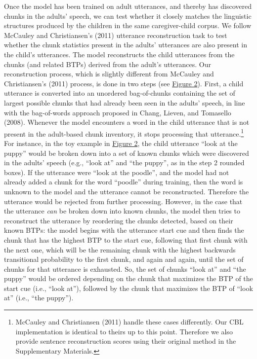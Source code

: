 \documentclass[
  english,
  man,floatsintext]{apa6}
\begin{document}
Once the model has been trained on adult utterances, and thereby has discovered chunks in the adults' speech, we can test whether it closely matches the linguistic structures produced by the children in the same caregiver-child corpus. We follow McCauley and Christiansen's (2011) utterance reconstruction task to test whether the chunk statistics present in the adults' utterances are also present in the child's utterances. The model reconstructs the child utterances from the chunks (and related BTPs) derived from the adult's utterances. Our reconstruction process, which is slightly different from McCauley and Christiansen's (2011) process, is done in two steps (see \protect\hyperlink{fig2}{Figure 2}). First, a child utterance is converted into an unordered bag-of-chunks containing the set of largest possible chunks that had already been seen in the adults' speech, in line with the bag-of-words approach proposed in Chang, Lieven, and Tomasello (2008). Whenever the model encounters a word in the child utterance that is not present in the adult-based chunk inventory, it stops processing that utterance.\footnote{McCauley and Christiansen (2011) handle these cases differently. Our CBL implementation is identical to theirs up to this point. Therefore we also provide sentence reconstruction scores using their original method in the Supplementary Materials.} For instance, in the toy example in \protect\hyperlink{fig2}{Figure 2}, the child utterance \enquote{look at the puppy} would be broken down into a set of known chunks which were discovered in the adults' speech (e.g., \enquote{look at} and \enquote{the puppy}, as in the step 2 rounded boxes). If the utterance were \enquote{look at the poodle}, and the model had not already added a chunk for the word \enquote{poodle} during training, then the word is unknown to the model and the utterance cannot be reconstructed. Therefore the utterance would be rejected from further processing. However, in the case that the utterance \emph{can} be broken down into known chunks, the model then tries to reconstruct the utterance by reordering the chunks detected, based on their known BTPs: the model begins with the utterance start cue and then finds the chunk that has the highest BTP to the start cue, following that first chunk with the next one, which will be the remaining chunk with the highest backwards transitional probability to the first chunk, and again and again, until the set of chunks for that utterance is exhausted. So, the set of chunks \enquote{look at} and \enquote{the puppy} would be ordered depending on the chunk that maximizes the BTP of the start cue (i.e., \enquote{look at}), followed by the chunk that maximizes the BTP of \enquote{look at} (i.e., \enquote{the puppy}).
\end{document}
